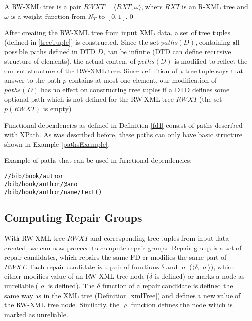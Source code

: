 \begin{define}
A RW-XML tree is a pair $RWXT = \langle RXT, \omega \rangle$, where $RXT$ is an R-XML tree and $\omega$ is a weight function from $N_T$ to $[0,1]$.\qed
\end{define}

After creating the RW-XML tree from input XML data, a set of tree tuples (defined in \ref{treeTuple}) is constructed. Since the set $paths(D)$, containing all possible paths defined in DTD $D$, can be infinite (DTD can define recursive structure of elements), the actual content of $paths(D)$ is modified to reflect the current structure of the RW-XML tree. Since definition of a tree tuple says that answer to the path $p$ contains at most one element, our modification of $paths(D)$ has no effect on constructing tree tuples if a DTD defines some optional path which is not defined for the RW-XML tree $RWXT$ (the set $p(RWXT)$ is empty).

Functional dependencies as defined in Definition \ref{fd1} consist of paths described with XPath. As was described before, these paths can only have basic structure shown in Example \ref{pathsExample}.

\begin{example}\label{pathsExample}
Example of paths that can be used in functional dependencies:
\begin{verbatim}
//bib/book/author
/bib/book/author/@ano
/bib/book/author/name/text()
\end{verbatim}
\end{example}

\subsection{Computing Repair Groups}

With RW-XML tree $RWXT$ and corresponding tree tuples from input data created, we can now proceed to compute repair groups. Repair group is a set of repair candidates, which repairs the same FD or modifies the same part of $RWXT$. Each repair candidate is a pair of functions $\delta$ and $\varrho$ ($\langle \delta, \varrho \rangle$), which either modifies value of an RW-XML tree node ($\delta$ is defined) or marks a node as unreliable ($\varrho$ is defined). The $\delta$ function of a repair candidate is defined the same way as in the XML tree (Definition \ref{xmlTree}) and defines a new value of the RW-XML tree node. Similarly, the $\varrho$ function defines the node which is marked as unreliable.

